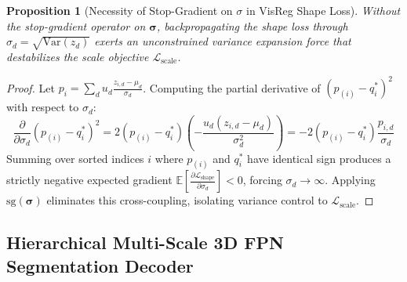 \documentclass{article}
\newtheorem{proposition}{Proposition}
\begin{document}
\begin{proposition}[Necessity of Stop-Gradient on $\sigma$ in VisReg Shape Loss]
\label{prop:visreg_stop_gradient}
Without the stop-gradient operator on $\boldsymbol{\sigma}$, backpropagating the shape loss through $\sigma_d = \sqrt{\text{Var}(z_d)}$ exerts an unconstrained variance expansion force that destabilizes the scale objective $\mathcal{L}_{\text{scale}}$.
\end{proposition}

\begin{proof}
Let $p_i = \sum_d u_d \frac{z_{i, d} - \mu_d}{\sigma_d}$. Computing the partial derivative of $(p_{(i)} - q_i^*)^2$ with respect to $\sigma_d$:
\begin{equation}
    \frac{\partial}{\partial \sigma_d} (p_{(i)} - q_i^*)^2 = 2 (p_{(i)} - q_i^*) \left( - \frac{u_d (z_{i, d} - \mu_d)}{\sigma_d^2} \right) = - 2 (p_{(i)} - q_i^*) \frac{p_{i, d}}{\sigma_d}
\end{equation}
Summing over sorted indices $i$ where $p_{(i)}$ and $q_i^*$ have identical sign produces a strictly negative expected gradient $\mathbb{E}\left[\frac{\partial \mathcal{L}_{\text{shape}}}{\partial \sigma_d}\right] < 0$, forcing $\sigma_d \to \infty$. Applying $\text{sg}(\boldsymbol{\sigma})$ eliminates this cross-coupling, isolating variance control to $\mathcal{L}_{\text{scale}}$.
\end{proof}

\subsection{Hierarchical Multi-Scale 3D FPN Segmentation Decoder}
\end{document}
